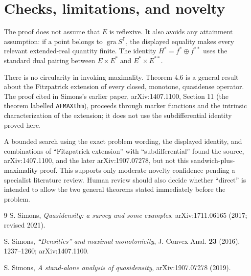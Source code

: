 \documentclass[11pt]{article}
\newcommand{\gra}{\operatorname{gra}}
\begin{document}
\section{Checks, limitations, and novelty}

The proof does not assume that $E$ is reflexive.  It also avoids any
attainment assumption: if a point belongs to $\gra S^{\mathbb F}$, the
displayed equality makes every relevant extended-real quantity finite.
The identity $H^*=f^*\oplus f^{**}$ uses the standard dual pairing between
$E\times E^*$ and $E^*\times E^{**}$.

There is no circularity in invoking maximality.  Theorem 4.6 is a general
result about the Fitzpatrick extension of every closed, monotone, quasidense
operator.  The proof cited in Simons's earlier paper, arXiv:1407.1100,
Section 11 (the theorem labelled \texttt{AFMAXthm}), proceeds through marker
functions and the intrinsic characterization of the extension; it does not
use the subdifferential identity proved here.

A bounded search using the exact problem wording, the displayed identity,
and combinations of ``Fitzpatrick extension'' with ``subdifferential'' found
the source, arXiv:1407.1100, and the later arXiv:1907.07278, but not this
sandwich-plus-maximality proof.  This supports only moderate novelty
confidence pending a specialist literature review.  Human review should also
decide whether ``direct'' is intended to allow the two general theorems stated
immediately before the problem.

\begin{thebibliography}{9}
S. Simons,
\emph{Quasidensity: a survey and some examples},
arXiv:1711.06165 (2017; revised 2021).

S. Simons,
\emph{``Densities'' and maximal monotonicity},
J. Convex Anal. \textbf{23} (2016), 1237--1260;
arXiv:1407.1100.

S. Simons,
\emph{A stand-alone analysis of quasidensity},
arXiv:1907.07278 (2019).
\end{thebibliography}
\end{document}
